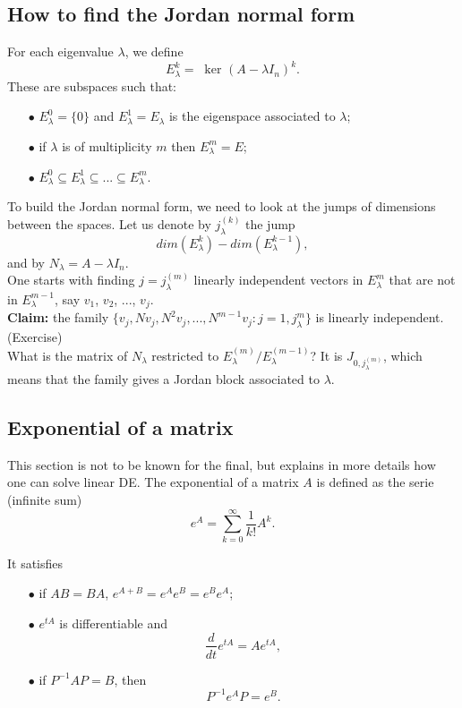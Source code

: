 \begin{itemize}
\subsection{How to find the Jordan normal form}  %

For each eigenvalue $\lambda$, we define 
\[E_\lambda^{k}= \ \text{ ker } (A-\lambda I_n)^k.\]
These are subspaces such that:
\begin{itemize}
\item[$\bullet$] $E_\lambda^{0}= \{0 \}$ and $E_\lambda^{1}=E_\lambda$ is the eigenspace associated to $\lambda$;
\item[$\bullet$] if $\lambda$ is of multiplicity $m$ then $E_\lambda^{m} = E$;
\item[$\bullet$] $E_\lambda^{0} \subseteq E_\lambda^{1} \subseteq ... \subseteq E_\lambda^{m}$.
\end{itemize}

To build the Jordan normal form, we need to look at the jumps of dimensions between the spaces. Let us denote by $j_\lambda^{(k)}$ the jump
\[dim(E_\lambda^{k}) -dim (E_\lambda^{k-1}),\]
and by $N_\lambda= A-\lambda I_n$.\\

One starts with finding $j= j^{(m)}_\lambda$ linearly independent vectors in $E_\lambda^{m}$ that are not in $E_\lambda^{m-1}$, say $v_1$, $v_2$, ..., $v_j$.\\

\textbf{Claim:} the family $\{v_j , Nv_j , N^2 v_j, ... , N^{m-1}v_j : j = 1, j_\lambda^{m}\}$ is linearly independent. (Exercise)\\

What is the matrix of $N_\lambda$ restricted to $E^{(m)}_\lambda /  E^{(m-1)}_\lambda $?
It is $J_{0,j_\lambda^{(m)}}$, which means that the family gives a Jordan block associated to $\lambda$.

\subsection{Exponential of a matrix}    %
This section is not to be known for the final, but explains in more details how one can solve linear DE. The exponential of a matrix $A$ is defined as the serie (infinite sum)
\[e^A = \sum_{k=0}^\infty \frac{1}{k!}A^k.\]

It satisfies
\begin{itemize}
\item[$\bullet$] if $AB = BA $, $e^{A+B } = e^A e^B = e^B e^A $;
\item[$\bullet$] $e^{tA}$ is differentiable and 
\[ \frac{d}{dt}e^{tA} = Ae^{tA},\]
\item[$\bullet$] if $P^{-1}A P = B$, then \[ P^{-1}e^A P= e^B.\]
\end{itemize}


\end{itemize}

